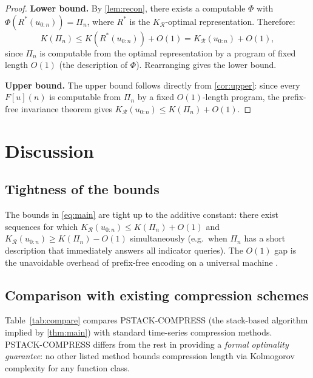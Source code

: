 \documentclass[preprint,12pt]{elsarticle}
\newcommand{\R}{\mathcal{R}}
\newcommand{\stack}{\Pi}
\begin{document}
\begin{proof}
\textbf{Lower bound.}
By \cref{lem:recon}, there exists a computable $\Phi$ with
$\Phi(R^*(u_{0:n})) = \stack_n$, where $R^*$ is the
$K_{\R}$-optimal representation.
Therefore:
\[
  K(\stack_n) \leq K(R^*(u_{0:n})) + O(1) = K_{\R}(u_{0:n}) + O(1),
\]
since $\stack_n$ is computable from the optimal representation
by a program of fixed length $O(1)$ (the description of $\Phi$).
Rearranging gives the lower bound.

\textbf{Upper bound.}
The upper bound follows directly from \cref{cor:upper}:
since every $F[u](n)$ is computable from $\stack_n$ by a fixed
$O(1)$-length program, the prefix-free invariance theorem gives
$K_{\R}(u_{0:n}) \leq K(\stack_n) + O(1)$.
\end{proof}

\section{Discussion}
\label{sec:discussion}

\subsection{Tightness of the bounds}

The bounds in \eqref{eq:main} are tight up to the additive
constant: there exist sequences for which
$K_{\R}(u_{0:n}) \leq K(\stack_n) + O(1)$ and
$K_{\R}(u_{0:n}) \geq K(\stack_n) - O(1)$ simultaneously
(e.g.\ when $\stack_n$ has a short description that immediately
answers all indicator queries).
The $O(1)$ gap is the unavoidable overhead of prefix-free
encoding on a universal machine \citep{LiVitanyi2008}.

\subsection{Comparison with existing compression schemes}

Table~\ref{tab:compare} compares PSTACK-COMPRESS
(the stack-based algorithm implied by \cref{thm:main})
with standard time-series compression methods.
PSTACK-COMPRESS differs from the rest in providing a
\emph{formal optimality guarantee}: no other listed method
bounds compression length via Kolmogorov complexity for any function class.
\end{document}
